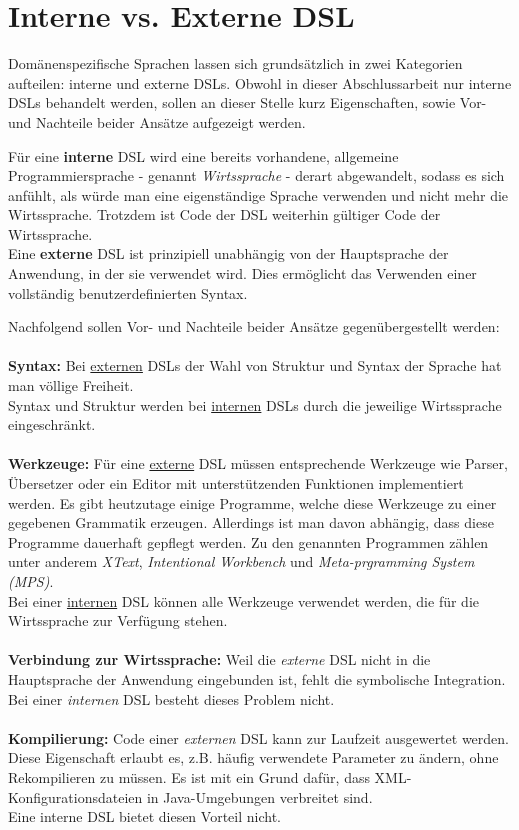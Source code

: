 \section{Interne vs. Externe DSL}\label{sct:intvsext}
Domänenspezifische Sprachen lassen sich grundsätzlich in zwei Kategorien aufteilen: interne und externe DSLs. Obwohl in dieser Abschlussarbeit nur interne DSLs behandelt werden, sollen an dieser Stelle kurz Eigenschaften, sowie Vor- und Nachteile beider Ansätze aufgezeigt werden.

Für eine \textbf{interne} DSL wird eine bereits vorhandene, allgemeine Programmiersprache - genannt \emph{Wirtssprache} - derart abgewandelt, sodass es sich anfühlt, als würde man eine eigenständige Sprache verwenden und nicht mehr die Wirtssprache. Trotzdem ist Code der DSL weiterhin gültiger Code der Wirtssprache.\\
Eine \textbf{externe} DSL ist prinzipiell unabhängig von der Hauptsprache der Anwendung, in der sie verwendet wird. Dies ermöglicht das Verwenden einer vollständig benutzerdefinierten Syntax.


Nachfolgend sollen Vor- und Nachteile beider Ansätze gegenübergestellt werden:
\\ \\
\textbf{Syntax:}
Bei \underline{externen} DSLs der Wahl von Struktur und Syntax der Sprache hat man völlige Freiheit.\\
Syntax und Struktur werden bei \underline{internen} DSLs durch die jeweilige Wirtssprache eingeschränkt.
\\ \\
\textbf{Werkzeuge:}
Für eine \underline{externe} DSL müssen entsprechende Werkzeuge wie Parser, Übersetzer oder ein Editor mit unterstützenden Funktionen implementiert 
werden. Es gibt heutzutage einige Programme, welche diese Werkzeuge zu einer gegebenen Grammatik erzeugen. Allerdings ist man davon abhängig, dass 
diese Programme dauerhaft gepflegt werden. Zu den genannten Programmen zählen unter anderem \emph{XText}\cite{www:xtext}, \emph{Intentional 
Workbench}\cite{www:intentsoft} und \emph{Meta-prgramming System (MPS)}\cite{www:mps}.\\
Bei einer \underline{internen} DSL können alle Werkzeuge verwendet werden, die für die Wirtssprache zur Verfügung stehen.
\\ \\
\textbf{Verbindung zur Wirtssprache:}
Weil die \emph{externe} DSL nicht in die Hauptsprache der Anwendung eingebunden ist, fehlt die symbolische Integration\cite{www:fowlerWorkbench}.\\
Bei einer \emph{internen} DSL besteht dieses Problem nicht.
\\ \\
\textbf{Kompilierung:}
Code einer \emph{externen} DSL kann zur Laufzeit ausgewertet werden. Diese Eigenschaft erlaubt es, z.B. häufig verwendete Parameter zu ändern, ohne 
Rekompilieren zu müssen. Es ist mit ein Grund dafür, dass XML-Konfigurationsdateien in Java-Umgebungen verbreitet sind\cite{www:fowlerWorkbench}.\\
Eine interne DSL bietet diesen Vorteil nicht.

